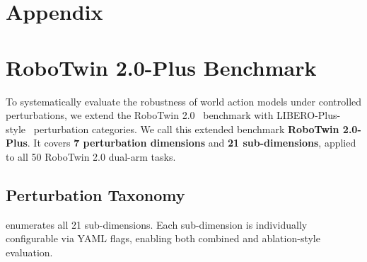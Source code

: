 \documentclass{article}
\begin{document}
\newpage

% 



\newpage

\appendix
\section*{Appendix}

\section{RoboTwin 2.0-Plus Benchmark}
\label{app:robotwin_plus}

To systematically evaluate the robustness of world action models under controlled perturbations, we extend the RoboTwin 2.0~\citep{chen2025robotwin} benchmark with LIBERO-Plus-style~\citep{fei25libero-plus} perturbation categories. We call this extended benchmark \textbf{RoboTwin 2.0-Plus}. It covers \textbf{7 perturbation dimensions} and \textbf{21 sub-dimensions}, applied to all 50 RoboTwin 2.0 dual-arm tasks.

\subsection{Perturbation Taxonomy}

 enumerates all 21 sub-dimensions. Each sub-dimension is individually configurable via YAML flags, enabling both combined and ablation-style evaluation.
\end{document}
